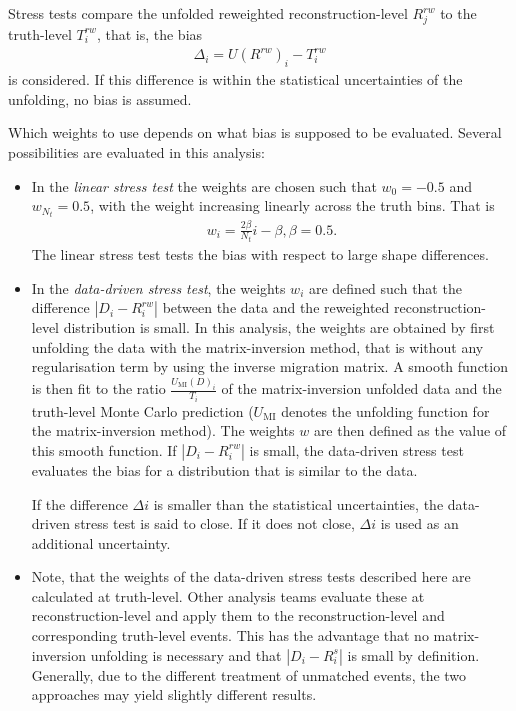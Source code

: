 Stress tests compare the unfolded reweighted reconstruction-level \(R_j^{rw}\) to the truth-level \(T_i^{rw}\), that is, the bias
\begin{align*}
    \Delta_i = {U(R^{rw})}_i - T_i^{rw}
\end{align*}
is considered. If this difference is within the statistical uncertainties of the unfolding, no bias is assumed.

Which weights to use depends on what bias is supposed to be evaluated. Several possibilities are evaluated in this analysis:
\begin{itemize}
    \item In the \emph{linear stress test} the weights are chosen such that \(w_0=-0.5\) and \(w_{N_t}=0.5\), with the weight increasing linearly across the truth bins. That is
    \begin{align*}
        w_i = \frac{2\beta}{N_t} i - \beta, \beta = 0.5.
    \end{align*}
    The linear stress test tests the bias with respect to large shape differences.

    \item In the \emph{data-driven stress test}, the weights \(w_i\) are defined such that the difference \(|D_i - R_i^{rw}|\) between the data and the reweighted reconstruction-level distribution is small. In this analysis, the weights are obtained by first unfolding the data with the matrix-inversion method, that is without any regularisation term by using the inverse migration matrix. A smooth function is then fit to the ratio \(\frac{{U_{\mathrm{MI}}(D)}_i}{T_i}\) of the matrix-inversion unfolded data and the truth-level Monte Carlo prediction (\(U_{\mathrm{MI}}\) denotes the unfolding function for the matrix-inversion method). The weights \(w\) are then defined as the value of this smooth function. If \(|D_i - R_i^{rw}|\) is small, the data-driven stress test evaluates the bias for a distribution that is similar to the data.

    If the difference \(\Delta i\) is smaller than the statistical uncertainties, the data-driven stress test is said to close. If it does not close, \(\Delta i\) is used as an additional uncertainty.

    \item Note, that the weights of the data-driven stress tests described here are calculated at truth-level. Other analysis teams evaluate these at reconstruction-level and apply them to the reconstruction-level and corresponding truth-level events. This has the advantage that no matrix-inversion unfolding is necessary and that \(|D_i - R_i^s|\) is small by definition. Generally, due to the different treatment of unmatched events, the two approaches may yield slightly different results.


\end{itemize}
